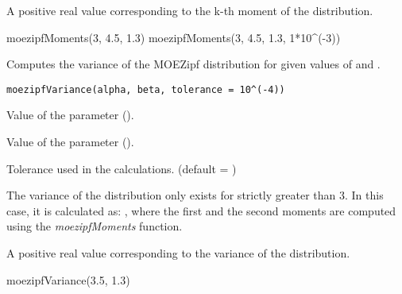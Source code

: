 \documentclass[letterpaper]{book}
\begin{document}
%
\begin{Value}
A positive real value corresponding to the k-th moment of the distribution.
\end{Value}
%
\begin{Examples}
\begin{ExampleCode}
moezipfMoments(3, 4.5, 1.3)
moezipfMoments(3, 4.5, 1.3,  1*10^(-3))
\end{ExampleCode}
\end{Examples}
%
\begin{Description}\relax
Computes the variance of the MOEZipf distribution for given values of \eqn{\alpha}{} and \eqn{\beta}{}.
\end{Description}
%
\begin{Usage}
\begin{verbatim}
moezipfVariance(alpha, beta, tolerance = 10^(-4))
\end{verbatim}
\end{Usage}
%
\begin{Arguments}
\begin{ldescription}
\item[\code{alpha}] Value of the \eqn{\alpha}{} parameter ().

\item[\code{beta}] Value of the \eqn{\beta}{} parameter ().

\item[\code{tolerance}] Tolerance used in the calculations. (default = )
\end{ldescription}
\end{Arguments}
%
\begin{Details}\relax
The variance of the distribution only exists for \eqn{\alpha}{} strictly greater than 3.
In this case, it is calculated as:
,
where the first and the second moments are computed using the \emph{moezipfMoments} function.
\end{Details}
%
\begin{Value}
A positive real value corresponding to the variance of the distribution.
\end{Value}
%
\begin{Examples}
\begin{ExampleCode}
moezipfVariance(3.5, 1.3)
\end{ExampleCode}
\end{Examples}
\end{document}
